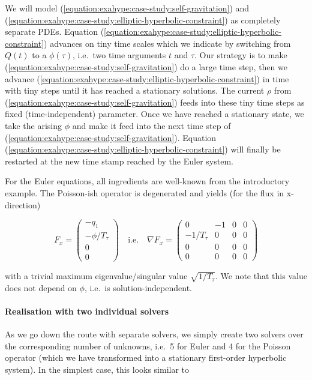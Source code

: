 \noindent
We will model (\ref{equation:exahype:case-study:self-gravitation}) and (\ref{equation:exahype:case-study:elliptic-hyperbolic-constraint})
as completely separate PDEs.
Equation (\ref{equation:exahype:case-study:elliptic-hyperbolic-constraint}) advances on tiny time scales 
which we indicate by switching from $Q(t)$ to a $\phi (\tau)$, i.e.~two time arguments $t$ and $\tau$.
Our strategy is to make (\ref{equation:exahype:case-study:self-gravitation}) do a large time
step, then we advance (\ref{equation:exahype:case-study:elliptic-hyperbolic-constraint}) in time with 
tiny steps until it has reached a stationary solutions.
The current $\rho $ from  (\ref{equation:exahype:case-study:self-gravitation}) feeds into these tiny time steps
as fixed (time-independent) parameter.
Once we have reached a stationary state, we take the arising $\phi$ and make it feed into the next time step
of  (\ref{equation:exahype:case-study:self-gravitation}).
Equation (\ref{equation:exahype:case-study:elliptic-hyperbolic-constraint}) will finally be restarted at the new 
time stamp reached by the Euler system.


For the Euler equations, all ingredients are well-known from the introductory
example. The Poisson-ish operator is degenerated and yields (for the flux in
x-direction)

\[
F_x = \left( \begin{array}{c} -q_1 \\   -\phi / T_\tau \\ 0 \\ 0 \end{array}
\right)
\quad \text{i.e.} \quad
\nabla F_x = \left( \begin{array}{cccc} 
  0 & -1 & 0 & 0 \\
 -1/T_\tau & 0 & 0 & 0 \\
  0 & 0 & 0 & 0 \\
  0 & 0 & 0 & 0
\end{array} \right)
\]


\noindent
with a trivial maximum eigenvalue/singular value $\sqrt{ 1/T_\tau }$.
We note that this value does not depend on $\phi $, i.e.~is
solution-independent.



\paragraph{Realisation with two individual solvers}
%
%
%
As we go down the route with separate solvers, we simply create two solvers over the corresponding number of unknowns, i.e.~5 for Euler
and 4 for the Poisson operator (which we have transformed into a stationary first-order hyperbolic system). 
In the simplest case, this looks similar to


